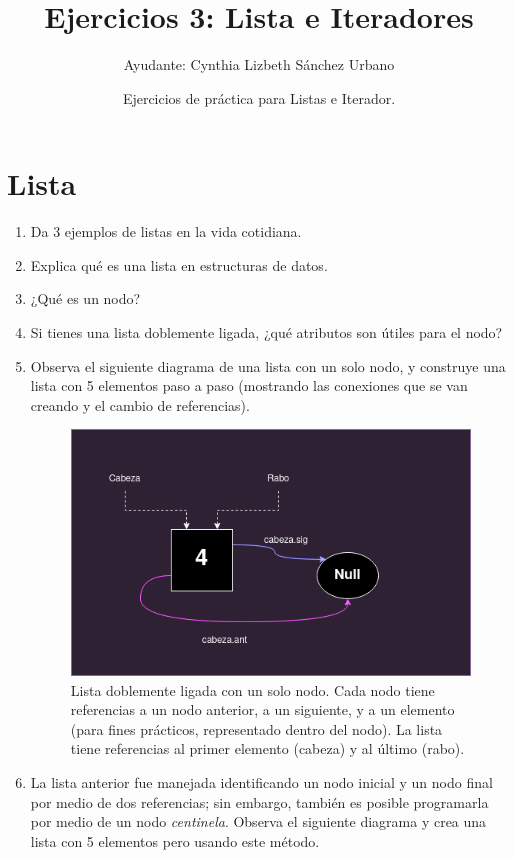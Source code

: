 \documentclass[12pt]{article} %
\begin{document}
\title{Ejercicios 3: Lista e Iteradores}
\author{Ayudante: Cynthia Lizbeth Sánchez Urbano}
\date{Ejercicios de práctica para Listas e Iterador.}
\maketitle
\section{Lista}
\begin{enumerate}
\item Da 3 ejemplos de listas en la vida cotidiana.
\item Explica qué es una lista en estructuras de datos.
\item ¿Qué es un nodo?
\item Si tienes una lista doblemente ligada, ¿qué atributos son útiles para el nodo?
\item Observa el siguiente diagrama de una lista con un solo nodo, y construye una lista con 5 elementos paso a paso (mostrando las conexiones que se van creando y el cambio de referencias).
\begin{figure}[H]
\centering
\includegraphics[scale=0.5]{ListaUnNodo.png}
\caption{Lista doblemente ligada con un solo nodo. Cada nodo tiene referencias a un nodo anterior, a un siguiente, y a un elemento (para fines prácticos, representado dentro del nodo). La lista tiene referencias al primer elemento (cabeza) y al último (rabo).}
\end{figure}
\item La lista anterior fue manejada identificando un nodo inicial y un nodo final por medio de dos referencias; sin embargo, también es posible programarla por medio de un nodo  \textit{centinela}. Observa el siguiente diagrama y crea una lista con 5 elementos pero usando este método.

\end{enumerate}
\end{document}
